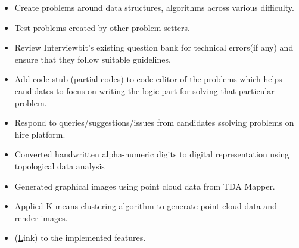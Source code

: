 \documentclass[10pt,a4paper,ragged2e]{altacv}
\begin{document}
\begin{itemize}

\item Create problems around data structures, algorithms across various difficulty.
\item Test problems created by other problem setters.
\item Review Interviewbit's existing question bank for technical errors(if any) and ensure that they follow suitable guidelines.  
\item Add code stub (partial codes) to code editor of the problems which helps candidates to focus on writing the logic part for solving that particular problem.
\item Respond to queries/suggestions/issues from candidates ssolving problems on hire platform.
\end{itemize}

\divider

\begin{itemize}
\item Converted handwritten alpha-numeric digits to digital representation using topological data analysis
\item Generated graphical images using point cloud data from TDA Mapper.
\item Applied K-means clustering algorithm to generate point cloud data and render images.
\item (\href{https://www.geeksforgeeks.org/hand-written-digits-using-topological-data-analysis/}Link\color{black}) to the implemented features.
\end{itemize}


\divider




    
\end{document}

